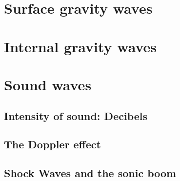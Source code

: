 \section{Surface gravity waves}
\section{Internal gravity waves}
\section{Sound waves}
\subsection{Intensity of sound: Decibels}
\subsection{The Doppler effect}
\subsection{Shock Waves and the sonic boom}